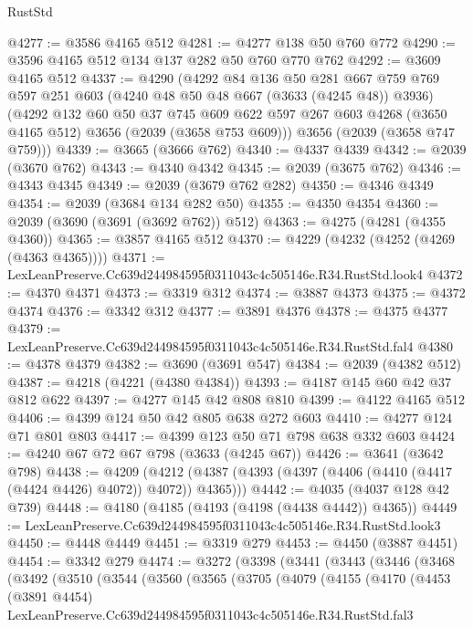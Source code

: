 \begin{lexlean}{RustStd}
\begin{coremodule}
@4277 := @3586 @4165 @512
@4281 := @4277 @138 @50 @760 @772
@4290 := @3596 @4165 @512 @134 @137 @282 @50 @760 @770 @762
@4292 := @3609 @4165 @512
@4337 := @4290
    (@4292
      @84
      @136
      @50
      @281
      @667
      @759
      @769
      @597
      @251
      @603
      (@4240 @48 @50 @48 @667 (@3633 (@4245 @48)) @3936)
      (@4292
        @132
        @60
        @50
        @37
        @745
        @609
        @622
        @597
        @267
        @603
        @4268
        (@3650 @4165 @512)
        @3656
        (@2039 (@3658 @753 @609)))
      @3656
      (@2039 (@3658 @747 @759)))
@4339 := @3665 (@3666 @762)
@4340 := @4337 @4339
@4342 := @2039 (@3670 @762)
@4343 := @4340 @4342
@4345 := @2039 (@3675 @762)
@4346 := @4343 @4345
@4349 := @2039 (@3679 @762 @282)
@4350 := @4346 @4349
@4354 := @2039 (@3684 @134 @282 @50)
@4355 := @4350 @4354
@4360 := @2039 (@3690 (@3691 (@3692 @762)) @512)
@4363 := @4275 (@4281 (@4355 @4360))
@4365 := @3857 @4165 @512
@4370 := @4229 (@4232 (@4252 (@4269 (@4363 @4365))))
@4371 := LexLeanPreserve.Cc639d244984595f0311043c4c505146e.R34.RustStd.look4
@4372 := @4370 @4371
@4373 := @3319 @312
@4374 := @3887 @4373
@4375 := @4372 @4374
@4376 := @3342 @312
@4377 := @3891 @4376
@4378 := @4375 @4377
@4379 := LexLeanPreserve.Cc639d244984595f0311043c4c505146e.R34.RustStd.fal4
@4380 := @4378 @4379
@4382 := @3690 (@3691 @547)
@4384 := @2039 (@4382 @512)
@4387 := @4218 (@4221 (@4380 @4384))
@4393 := @4187 @145 @60 @42 @37 @812 @622
@4397 := @4277 @145 @42 @808 @810
@4399 := @4122 @4165 @512
@4406 := @4399 @124 @50 @42 @805 @638 @272 @603
@4410 := @4277 @124 @71 @801 @803
@4417 := @4399 @123 @50 @71 @798 @638 @332 @603
@4424 := @4240 @67 @72 @67 @798 (@3633 (@4245 @67))
@4426 := @3641 (@3642 @798)
@4438 := @4209
    (@4212 (@4387 (@4393 (@4397 (@4406 (@4410 (@4417 (@4424 @4426) @4072)) @4072)) @4365)))
@4442 := @4035 (@4037 @128 @42 @739)
@4448 := @4180 (@4185 (@4193 (@4198 (@4438 @4442)) @4365))
@4449 := LexLeanPreserve.Cc639d244984595f0311043c4c505146e.R34.RustStd.look3
@4450 := @4448 @4449
@4451 := @3319 @279
@4453 := @4450 (@3887 @4451)
@4454 := @3342 @279
@4474 := @3272
    (@3398
      (@3441
        (@3443
          (@3446
            (@3468
              (@3492
                (@3510
                  (@3544
                    (@3560
                      (@3565
                        (@3705
                          (@4079
                            (@4155
                              (@4170
                                (@4453
                                  (@3891 @4454)
                                  LexLeanPreserve.Cc639d244984595f0311043c4c505146e.R34.RustStd.fal3

\end{coremodule}
\end{lexlean}
